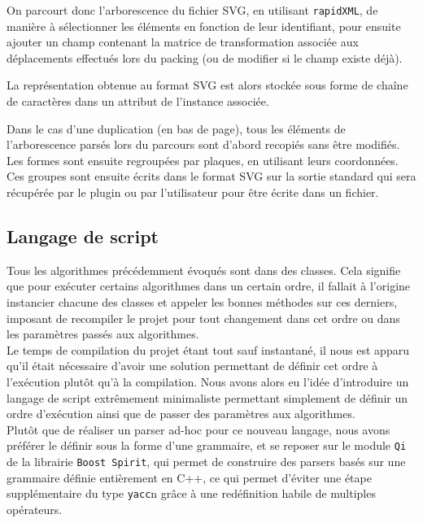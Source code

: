 On parcourt donc l'arborescence du fichier SVG, en utilisant \texttt{rapidXML}, de manière à sélectionner les éléments en fonction de leur identifiant, pour ensuite ajouter un champ contenant la matrice de transformation associée aux déplacements effectués lors du packing (ou de modifier si le champ existe déjà).

La représentation obtenue au format SVG est alors stockée sous forme de chaîne de caractères dans un attribut de l'instance associée. %

Dans le cas d'une duplication (en bas de page), tous les éléments de l'arborescence parsés lors du parcours sont d'abord recopiés sans être modifiés. 
Les formes sont ensuite regroupées par plaques, en utilisant leurs coordonnées.
Ces groupes sont ensuite écrits dans le format SVG sur la sortie standard qui sera récupérée par le plugin ou par l'utilisateur pour être écrite dans un fichier.


\subsection{Langage de script}
Tous les algorithmes précédemment évoqués sont dans des classes. Cela signifie que pour exécuter certains algorithmes dans un certain ordre, il fallait à l'origine instancier chacune des classes et appeler les bonnes méthodes sur ces derniers, imposant de recompiler le projet pour tout changement dans cet ordre ou dans les paramètres passés aux algorithmes.\\

Le temps de compilation du projet étant tout sauf instantané, il nous est apparu qu'il était nécessaire d'avoir une solution permettant de définir cet ordre à l'exécution plutôt qu'à la compilation. Nous avons alors eu l'idée d'introduire un langage de script extrêmement minimaliste permettant simplement de définir un ordre d'exécution ainsi que de passer des paramètres aux algorithmes.\\

Plutôt que de réaliser un parser ad-hoc pour ce nouveau langage, nous avons préférer le définir sous la forme d'une grammaire, et se reposer sur le module \texttt{Qi} de la librairie \texttt{Boost Spirit}, qui permet de construire des parsers basés sur une grammaire définie entièrement en C++, ce qui permet d'éviter une étape supplémentaire du type \texttt{yacc}n grâce à une redéfinition habile de multiples opérateurs.\\

